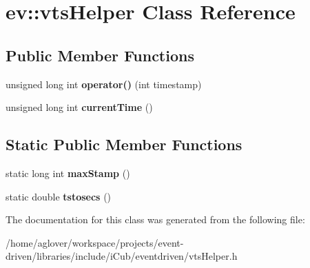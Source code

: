 \hypertarget{classev_1_1vtsHelper}{}\section{ev\+:\+:vts\+Helper Class Reference}
\label{classev_1_1vtsHelper}
\subsection*{Public Member Functions}
\begin{DoxyCompactItemize}
\item 
unsigned long int {\bfseries operator()} (int timestamp)\hypertarget{classev_1_1vtsHelper_a399c3a719f7544209ba77f442c97c135}{}\label{classev_1_1vtsHelper_a399c3a719f7544209ba77f442c97c135}

\item 
unsigned long int {\bfseries current\+Time} ()\hypertarget{classev_1_1vtsHelper_ab8b7f4f4240f2a0f0279bda5f5f2caff}{}\label{classev_1_1vtsHelper_ab8b7f4f4240f2a0f0279bda5f5f2caff}

\end{DoxyCompactItemize}
\subsection*{Static Public Member Functions}
\begin{DoxyCompactItemize}
\item 
static long int {\bfseries max\+Stamp} ()\hypertarget{classev_1_1vtsHelper_aa7f1c13eb051773e9413b52bb52caad0}{}\label{classev_1_1vtsHelper_aa7f1c13eb051773e9413b52bb52caad0}

\item 
static double {\bfseries tstosecs} ()\hypertarget{classev_1_1vtsHelper_a07d0dc3cd7743eff7d594e838ae23a01}{}\label{classev_1_1vtsHelper_a07d0dc3cd7743eff7d594e838ae23a01}

\end{DoxyCompactItemize}


The documentation for this class was generated from the following file\+:\begin{DoxyCompactItemize}
\item 
/home/aglover/workspace/projects/event-\/driven/libraries/include/i\+Cub/eventdriven/vts\+Helper.\+h\end{DoxyCompactItemize}
